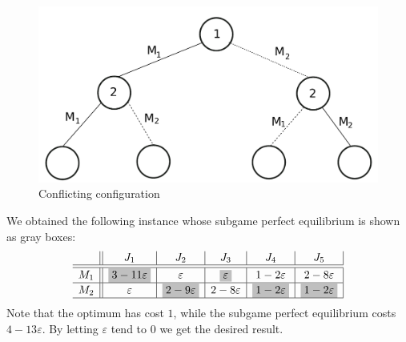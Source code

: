 \documentclass[12pt,a4paper]{article}
\theoremstyle{definition}
\theoremstyle{remark}
\newcommand{\take}[1]{\colorbox{emphcol}{$#1$}}
\renewcommand{\epsilon}{\varepsilon}
\begin{document}
\begin{figure}
	\centering
	\includegraphics[scale=.52]{structural}
	\caption{Conflicting configuration}
	\label{fig:conflicting}
\end{figure}

	We obtained the following instance whose subgame perfect equilibrium is shown as  gray boxes: 
	\begin{align} \label{eq:SPE:five-players}
	\begin{array}{c||c| c| c | c | c|}
	& J_1 & J_2 & J_3 & J_4 & J_5 \\ \hline\hline
	M_1 & \take{3-11\epsilon} & \epsilon & \take{\epsilon} & 1-2\epsilon & 2-8\epsilon \\ \hline
	M_2 & \epsilon & \take{2-9\epsilon} & 2-8\epsilon & \take{1-2\epsilon} & \take{1-2\epsilon} \\ \hline
	\end{array}
	\end{align}
	Note that the optimum has cost $1$, while the subgame perfect equilibrium costs $4-13\epsilon$. By letting $\epsilon$ tend to $0$ we get the desired result.  
	
\end{document}
